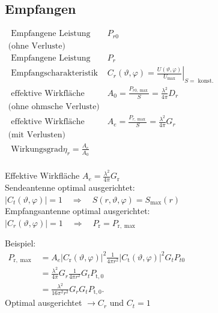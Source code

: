 \documentclass[english]{latex4ei/latex4ei_sheet}
\begin{document}
\begin{sectionbox}
\subsection{Empfangen}
$\begin{array}{ll}
	\text { Empfangene Leistung } & P_{r 0} \\  
	\text{(ohne Verluste)}	&\\
	\text { Empfangene Leistung } & P_{r} \\ 
	\text { Empfangscharakteristik } & C_{r}(\vartheta, \varphi)=\left.\frac{U(\vartheta, \varphi)}{U_{\max }}\right|_{S=\text { konst. }} \\
	\text { effektive Wirkfläche } & A_{0}=\frac{P_{r 0, \max }}{S}=\frac{\lambda^{2}}{4 \pi} D_{r} \\
	\text{(ohne ohmsche Verluste)}	&\\ 
	\text { effektive Wirkfläche } & A_{e}=\frac{P_{r, \max }}{S}=\frac{\lambda^{2}}{4 \pi} G_{r} \\  
	\text{(mit Verlusten)}&\\
	 \text { Wirkungsgrad}\eta_{r}=\frac{A_{e}}{A_{0}} \\
\end{array}$

\end{sectionbox}
\begin{sectionbox}

\begin{emphbox}
\begin{flushleft}
Effektive Wirkfläche 	$A_{e}=\frac{\lambda^{2}}{4 \pi}G_{\mathrm{r}}$\\
Sendeantenne optimal ausgerichtet:\\
$\left|C_{t}(\vartheta, \varphi)\right|=1 \quad \Rightarrow \quad S(r, \vartheta, \varphi)=S_{\max }(r)$\\
Empfangsantenne optimal ausgerichtet:\\
$\left|C_{r}(\vartheta, \varphi)\right|=1 \quad \Rightarrow \quad P_{\mathrm{r}}=P_{\mathrm{r}, \max }$
\end{flushleft}
\end{emphbox}
\end{sectionbox}
\begin{sectionbox}
	Beispiel: \\
	$\begin{aligned} P_{\mathrm{r}, \max } &=A_{e}\left|C_{\mathrm{r}}(\vartheta, \varphi)\right|^{2} \frac{1}{4 \pi r^{2}}\left|C_{\mathrm{t}}(\vartheta, \varphi)\right|^{2} G_{t} P_{t 0}\\ 
		&=\frac{\lambda^{2}}{4 \pi} G_{r} \frac{1}{4 \pi r^{2}} G_{t} P_{\mathrm{t}, 0} \\
		&=\frac{\lambda^{2}}{16 \pi^{2} r^{2}} G_{r} G_{t} P_{\mathrm{t}, 0} . \end{aligned}$\\
	Optimal ausgerichtet $\rightarrow C_r$ und $C_t=1$
\end{sectionbox}
\end{document}
